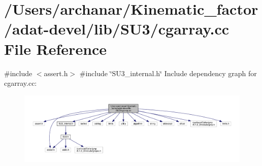 \hypertarget{adat-devel_2lib_2SU3_2cgarray_8cc}{}\section{/\+Users/archanar/\+Kinematic\+\_\+factor/adat-\/devel/lib/\+S\+U3/cgarray.cc File Reference}
\label{adat-devel_2lib_2SU3_2cgarray_8cc}
{\ttfamily \#include $<$assert.\+h$>$}\newline
{\ttfamily \#include \char`\"{}S\+U3\+\_\+internal.\+h\char`\"{}}\newline
Include dependency graph for cgarray.\+cc\+:
\nopagebreak
\begin{figure}[H]
\begin{center}
\leavevmode
\includegraphics[width=350pt]{d0/dfa/adat-devel_2lib_2SU3_2cgarray_8cc__incl}
\end{center}
\end{figure}
